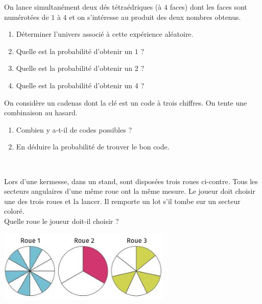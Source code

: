 \documentclass[11pt]{article}
\begin{document}
\begin{exo}
  On lance simultanément deux dés tétraédriques (à $4$ faces) dont les faces
  sont numérotées de $1$ à $4$ et on s'intéresse au produit des deux nombres
  obtenus.
  \begin{enumerate}
    \item Déterminer l'univers associé à cette expérience aléatoire.
    \item Quelle est la probabilité d'obtenir un $1$ ?
    \item Quelle est la probabilité d'obtenir un $2$ ?
    \item Quelle est la probabilité d'obtenir un $4$ ?
  \end{enumerate}
\end{exo}

\begin{exo}
  On considère un cadenas dont la clé est un code à trois chiffres. On tente une
  combinaison au hasard.
  \begin{enumerate}
    \item Combien y a-t-il de codes possibles ?
    \item En déduire la probabilité de trouver le bon code.
  \end{enumerate}
\end{exo}

\begin{exo}~\\
  \begin{minipage}[]{.5\textwidth}
    Lors d'une kermesse, dans un stand, sont disposées trois roues ci-contre.
    Tous les secteurs angulaires d'une même roue ont la même mesure. Le joueur
    doit choisir une des trois roues et la lancer. Il remporte un lot s'il tombe
    sur un secteur coloré.\\
    Quelle roue le joueur doit-il choisir ?
  \end{minipage}
  \begin{minipage}[]{.5\textwidth}
    \begin{center}
      \includegraphics[scale=.7]{roues.png}
    \end{center}
  \end{minipage}
\end{exo}
\end{document}
